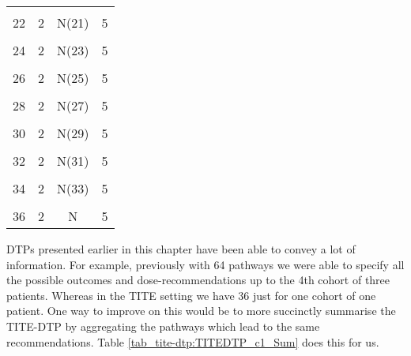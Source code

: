 \begin{table}[H]
{\begin{tabular}[t]{cccc}
			\cellcolor{gray!6}{21} & \cellcolor{gray!6}{2} & \cellcolor{gray!6}{N(20)} & \cellcolor{gray!6}{5}\\
			22 & 2 & N(21) & 5\\
			\cellcolor{gray!6}{23} & \cellcolor{gray!6}{2} & \cellcolor{gray!6}{N(22)} & \cellcolor{gray!6}{5}\\
			24 & 2 & N(23) & 5\\
			\cellcolor{gray!6}{25} & \cellcolor{gray!6}{2} & \cellcolor{gray!6}{N(24)} & \cellcolor{gray!6}{5}\\
			26 & 2 & N(25) & 5\\
			\cellcolor{gray!6}{27} & \cellcolor{gray!6}{2} & \cellcolor{gray!6}{N(26)} & \cellcolor{gray!6}{5}\\
			28 & 2 & N(27) & 5\\
			\cellcolor{gray!6}{29} & \cellcolor{gray!6}{2} & \cellcolor{gray!6}{N(28)} & \cellcolor{gray!6}{5}\\
			30 & 2 & N(29) & 5\\
			\cellcolor{gray!6}{31} & \cellcolor{gray!6}{2} & \cellcolor{gray!6}{N(30)} & \cellcolor{gray!6}{5}\\
			32 & 2 & N(31) & 5\\
			\cellcolor{gray!6}{33} & \cellcolor{gray!6}{2} & \cellcolor{gray!6}{N(32)} & \cellcolor{gray!6}{5}\\
			34 & 2 & N(33) & 5\\
			\cellcolor{gray!6}{35} & \cellcolor{gray!6}{2} & \cellcolor{gray!6}{N(34)} & \cellcolor{gray!6}{5}\\
			36 & 2 & N & 5\\
			\bottomrule
	\end{tabular}}
\end{table}

DTPs presented earlier in this chapter have been able to convey a lot of information. For example, previously with 64 pathways we were able to specify all the possible outcomes and dose-recommendations up to the 4th cohort of three patients. Whereas in the TITE setting we have 36 just for one cohort of one patient. One way to improve on this would be to more succinctly summarise the TITE-DTP by aggregating the pathways which lead to the same recommendations. Table \ref{tab_tite-dtp:TITEDTP_c1_Sum} does this for us. 

